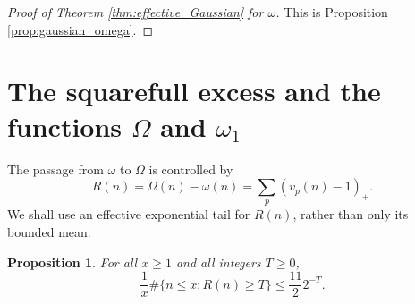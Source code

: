 \documentclass[12pt,a4paper,reqno]{amsart}
\theoremstyle{plain}
\newtheorem{prpstn}[thrm]{Proposition}
\numberwithin{sblmm}{thrm}
\numberwithin{equation}{section}
\begin{document}
\begin{proof}[Proof of Theorem \ref{thm:effective_Gaussian} for $\omega$]
    This is Proposition \ref{prop:gaussian_omega}.
\end{proof}

\section{The squarefull excess and the functions \texorpdfstring{$\Omega$ and $\omega_1$}{Omega and omega1}}
The passage from $\omega$ to $\Omega$ is controlled by
$$R(n)=\Omega(n)-\omega(n)=\sum_p(v_p(n)-1)_+.$$
We shall use an effective exponential tail for $R(n)$, rather than only its bounded mean.

\begin{prpstn}\label{prop:R_tail}
    For all $x\ge 1$ and all integers $T\ge 0$,
    \begin{equation}\label{eqn:R_tail}
        \frac{1}{x}\#\{n\le x:R(n)\ge T\}\le\frac{11}{2}2^{-T}.
    \end{equation}
\end{prpstn}
\end{document}
